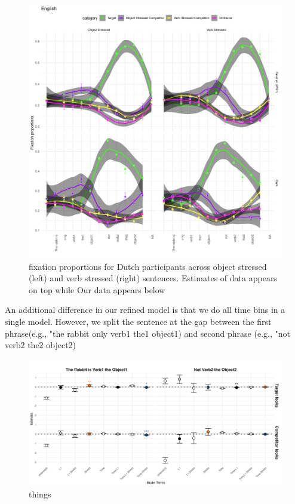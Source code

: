 \begin{figure}[H]  %
    \centering
    \includegraphics[width=\textwidth,height=\textheight,keepaspectratio]{viz/dutch_fix2.png}
    \caption{fixation proportions for Dutch participants across object stressed (left) and verb stressed (right) sentences. Estimates of \citep{Ge2021} data appears on top while Our data appears below}
    \label{fig:dutch_fix2}
\end{figure}

An additional difference in our refined model is that we do all time bins in a single model. However, we split the sentence at the gap between the first phrase(e.g., "the rabbit only verb1 the1 object1) and second phrase (e.g., "not verb2 the2 object2)

\begin{figure}[H]  %
    \centering
    \includegraphics[width=\textwidth,height=\textheight,keepaspectratio]{viz/gam_mod_out.png}
    \caption{things}
    \label{fig:gam_mod_out}
\end{figure}

